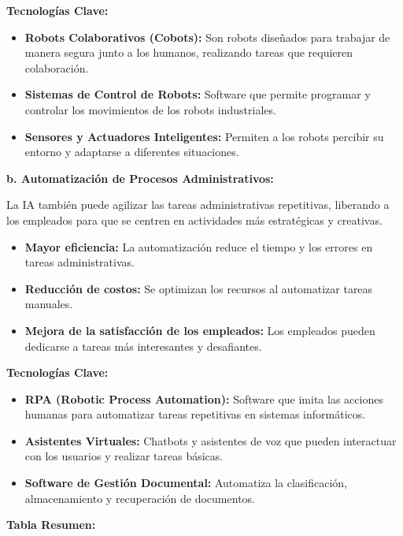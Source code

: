 \documentclass[
  10pt,
  letterpaper,
]{book}
\providecommand{\tightlist}{%
  \setlength{\itemsep}{0pt}\setlength{\parskip}{0pt}}\usepackage{longtable,booktabs,array}
\begin{document}
\textbf{Tecnologías Clave:}

\begin{itemize}
\tightlist
\item
  \textbf{Robots Colaborativos (Cobots):} Son robots diseñados para
  trabajar de manera segura junto a los humanos, realizando tareas que
  requieren colaboración.
\item
  \textbf{Sistemas de Control de Robots:} Software que permite programar
  y controlar los movimientos de los robots industriales.
\item
  \textbf{Sensores y Actuadores Inteligentes:} Permiten a los robots
  percibir su entorno y adaptarse a diferentes situaciones.
\end{itemize}

\textbf{b. Automatización de Procesos Administrativos:}

La IA también puede agilizar las tareas administrativas repetitivas,
liberando a los empleados para que se centren en actividades más
estratégicas y creativas.

\begin{itemize}
\tightlist
\item
  \textbf{Mayor eficiencia:} La automatización reduce el tiempo y los
  errores en tareas administrativas.
\item
  \textbf{Reducción de costos:} Se optimizan los recursos al automatizar
  tareas manuales.
\item
  \textbf{Mejora de la satisfacción de los empleados:} Los empleados
  pueden dedicarse a tareas más interesantes y desafiantes.
\end{itemize}

\textbf{Tecnologías Clave:}

\begin{itemize}
\tightlist
\item
  \textbf{RPA (Robotic Process Automation):} Software que imita las
  acciones humanas para automatizar tareas repetitivas en sistemas
  informáticos.
\item
  \textbf{Asistentes Virtuales:} Chatbots y asistentes de voz que pueden
  interactuar con los usuarios y realizar tareas básicas.
\item
  \textbf{Software de Gestión Documental:} Automatiza la clasificación,
  almacenamiento y recuperación de documentos.
\end{itemize}

\textbf{Tabla Resumen:}
\end{document}

